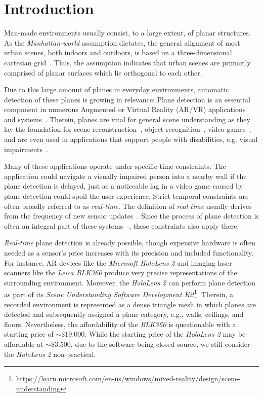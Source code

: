 \documentclass[main.tex]{subfiles}
\begin{document}
\setcounter{page}{1}
\chapter{Introduction}
\label{chap:Introduction}

Man-made environments usually consist, to a large extent, of planar structures.
As the \textit{Manhattan-world} assumption dictates, the general alignment of most urban scenes, both indoors and outdoors, is based on a three-dimensional cartesian grid~\cite{Coughlan_Yuille_1999}. Thus, the assumption indicates that urban scenes are primarily comprised of planar surfaces which lie orthogonal to each other.

Due to this large amount of planes in everyday environments, automatic detection of these planes is growing in relevance:
Plane detection is an essential component in numerous Augmented or Virtual Reality (AR/VR) applications and systems~\cite{Jurado_Jurado_Ortega_Feito_2021, sridhar2020instant}.
Therein, planes are vital for general scene understanding as they lay the foundation for scene reconstruction~\cite{agarwala2022planeformers}, object recognition~\cite{Peternell_Steiner_2004, Qian_Ye_2014}, video games~\cite{ninja}, and are even used in applications that support people with disabilities, e.g. visual impairments~\cite{visimpaired, Schwarze_Lauer_Schwaab_Romanovas_Bohm_Jurgensohn_2015}.


Many of these applications operate under specific time constraints: The application could navigate a visually impaired person into a nearby wall if the plane detection is delayed, just as a noticeable lag in a video game caused by plane detection could spoil the user experience.
Strict temporal constraints are often broadly referred to as \textit{real-time}.
The definition of \textit{real-time} usually derives from the frequency of new sensor updates~\cite{Davison_2003}.
Since the process of plane detection is often an integral part of these systems ~\cite{Wang_Bu_Zhang_Cheng_2022, Dai_Lund_Gao_2022, Kaess_2015}, these constraints also apply there.

\textit{Real-time} plane detection is already possible, though expensive hardware is often needed as a sensor's price increases
with its precision and included functionality.
For instance, AR devices like the \textit{Microsoft HoloLens 2} and imaging laser scanners like the \textit{Leica BLK360} produce very precise representations of the surrounding environment.
Moreover, the \textit{HoloLens 2} can perform plane detection as part of its \textit{Scene Understanding Software Development Kit}\footnote{\href{https://learn.microsoft.com/en-us/windows/mixed-reality/design/scene-understanding}{https://learn.microsoft.com/en-us/windows/mixed-reality/design/scene-understanding}}. Therein, a recorded environment is represented as a dense triangle mesh in which planes are detected and subsequently assigned a plane category, e.g., walls, ceilings, and floors.
Nevertheless, the affordability of the \textit{BLK360} is questionable with a starting price of ${\sim}\$19.000$. While the starting price of the \textit{HoloLens 2} may be affordable at ${\sim}\$3.500$, due to the software being closed source, we still consider the \textit{HoloLens 2} non-practical.
\end{document}
